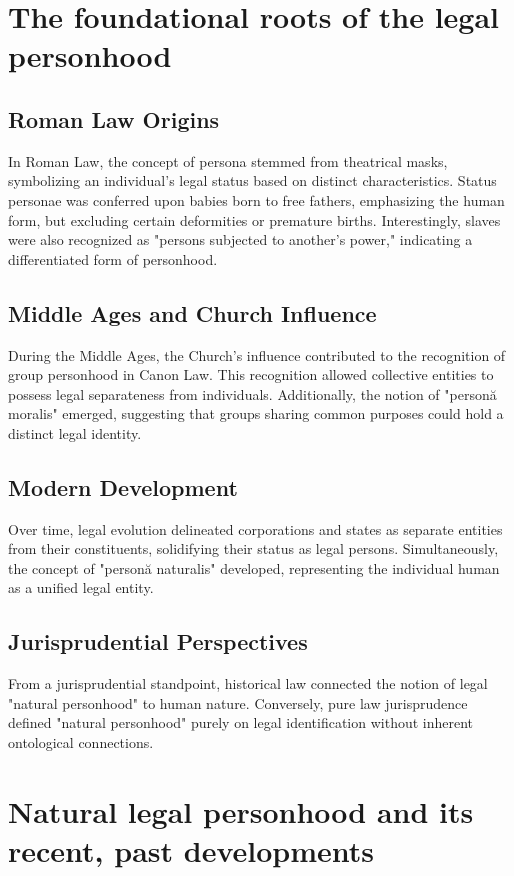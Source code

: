 \section{The foundational roots of the legal personhood}

\subsection{Roman Law Origins}
In Roman Law, the concept of persona stemmed from theatrical masks, symbolizing an individual's legal status based on distinct characteristics. Status personae was conferred upon babies born to free fathers, emphasizing the human form, but excluding certain deformities or premature births. Interestingly, slaves were also recognized as "persons subjected to another's power," indicating a differentiated form of personhood.

\subsection{Middle Ages and Church Influence}
During the Middle Ages, the Church's influence contributed to the recognition of group personhood in Canon Law. This recognition allowed collective entities to possess legal separateness from individuals. Additionally, the notion of "personă moralis" emerged, suggesting that groups sharing common purposes could hold a distinct legal identity.

\subsection{Modern Development}
Over time, legal evolution delineated corporations and states as separate entities from their constituents, solidifying their status as legal persons. Simultaneously, the concept of "personă naturalis" developed, representing the individual human as a unified legal entity.

\subsection{Jurisprudential Perspectives}
From a jurisprudential standpoint, historical law connected the notion of legal "natural personhood" to human nature. Conversely, pure law jurisprudence defined "natural personhood" purely on legal identification without inherent ontological connections.

\section{Natural legal personhood and its recent, past 
developments}

